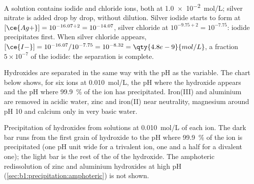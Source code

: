 \begin{example}\label{ex:b1:precipitation:i-cl}
A solution contains iodide and chloride ions, both at
\qty{1.0e-2}{mol/L}; silver nitrate is added drop by drop, without
dilution. Silver iodide starts to form at $[\ce{Ag+}] = 10^{-16.07 + 2} =
10^{-14.07}$, silver chloride at $10^{-9.75 + 2} = 10^{-7.75}$: iodide
precipitates first. When silver chloride appears,
$[\ce{I-}] = 10^{-16.07}/10^{-7.75} = 10^{-8.32} = \qty{4.8e-9}{mol/L}$,
a fraction $5 \times 10^{-7}$ of the iodide: the separation is complete.
\end{example}

Hydroxides are separated in the same way with the pH as the variable.
The chart below shows, for six ions at
\qty{0.010}{mol/L}, the pH where the hydroxide appears and the pH where
\qty{99.9}{\percent} of the ion has precipitated. Iron(III) and aluminium are
removed in acidic water, zinc and iron(II) near neutrality, magnesium
around pH 10 and calcium only in very basic water.

\begin{omfigure}

{\small Precipitation of hydroxides from solutions at \qty{0.010}{mol/L} of
each ion. The dark bar runs from the first grain of hydroxide to the pH
where \qty{99.9}{\percent} of the ion is precipitated (one pH unit wide for a
trivalent ion, one and a half for a divalent one); the light bar is the
rest of the  of the hydroxide. The amphoteric
redissolution of zinc and aluminium hydroxides at high pH
(\cref{sec:b1:precipitation:amphoteric}) is not shown.}
\end{omfigure}

